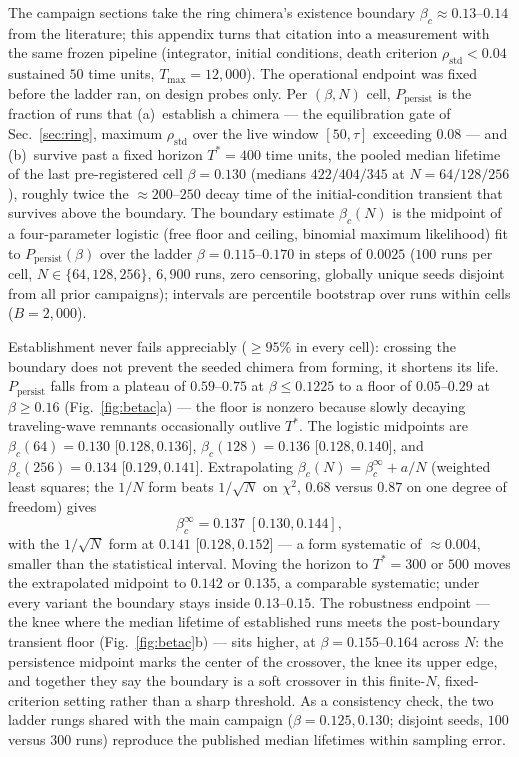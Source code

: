 The campaign sections take the ring chimera's existence boundary
$\beta_c \approx 0.13$--$0.14$ from the literature; this appendix turns that
citation into a measurement with the same frozen pipeline (integrator, initial
conditions, death criterion $\rho_{\mathrm{std}} < 0.04$ sustained $50$ time
units, $T_{\max} = 12{,}000$). The operational endpoint was fixed before the
ladder ran, on design probes only. Per $(\beta, N)$ cell,
$P_{\mathrm{persist}}$ is the fraction of runs that (a)~establish a chimera ---
the equilibration gate of Sec.~\ref{sec:ring}, maximum $\rho_{\mathrm{std}}$
over the live window $[50, \tau]$ exceeding $0.08$ --- and (b)~survive past a
fixed horizon $T^{*} = 400$ time units, the pooled median lifetime of the last
pre-registered cell $\beta = 0.130$ (medians $422/404/345$ at
$N = 64/128/256$), roughly twice the ${\approx}200$--$250$ decay time of the
initial-condition transient that survives above the boundary. The boundary
estimate $\beta_c(N)$ is the midpoint of a four-parameter logistic (free floor
and ceiling, binomial maximum likelihood) fit to $P_{\mathrm{persist}}(\beta)$
over the ladder $\beta = 0.115$--$0.170$ in steps of $0.0025$ ($100$ runs per
cell, $N \in \{64, 128, 256\}$, $6{,}900$ runs, zero censoring, globally unique
seeds disjoint from all prior campaigns); intervals are percentile bootstrap
over runs within cells ($B = 2{,}000$).

Establishment never fails appreciably ($\ge 95\%$ in every cell): crossing the
boundary does not prevent the seeded chimera from forming, it shortens its
life. $P_{\mathrm{persist}}$ falls from a plateau of $0.59$--$0.75$ at
$\beta \le 0.1225$ to a floor of $0.05$--$0.29$ at $\beta \ge 0.16$
(Fig.~\ref{fig:betac}a) --- the floor is nonzero because slowly decaying
traveling-wave remnants occasionally outlive $T^{*}$. The logistic midpoints
are $\beta_c(64) = 0.130$ [$0.128, 0.136$], $\beta_c(128) = 0.136$
[$0.128, 0.140$], and $\beta_c(256) = 0.134$ [$0.129, 0.141$]. Extrapolating
$\beta_c(N) = \beta_c^{\infty} + a/N$ (weighted least squares; the $1/N$ form
beats $1/\sqrt{N}$ on $\chi^2$, $0.68$ versus $0.87$ on one degree of freedom)
gives
\[
\beta_c^{\infty} = 0.137 \; [0.130, 0.144],
\]
with the $1/\sqrt{N}$ form at $0.141$ [$0.128, 0.152$] --- a form systematic of
${\approx}0.004$, smaller than the statistical interval. Moving the horizon to
$T^{*} = 300$ or $500$ moves the extrapolated midpoint to $0.142$ or $0.135$, a
comparable systematic; under every variant the boundary stays inside
$0.13$--$0.15$. The robustness endpoint --- the knee where the median lifetime
of established runs meets the post-boundary transient floor
(Fig.~\ref{fig:betac}b) --- sits higher, at $\beta = 0.155$--$0.164$ across
$N$: the persistence midpoint marks the center of the crossover, the knee its
upper edge, and together they say the boundary is a soft crossover in this
finite-$N$, fixed-criterion setting rather than a sharp threshold. As a
consistency check, the two ladder rungs shared with the main campaign
($\beta = 0.125, 0.130$; disjoint seeds, $100$ versus $300$ runs) reproduce the
published median lifetimes within sampling error.

